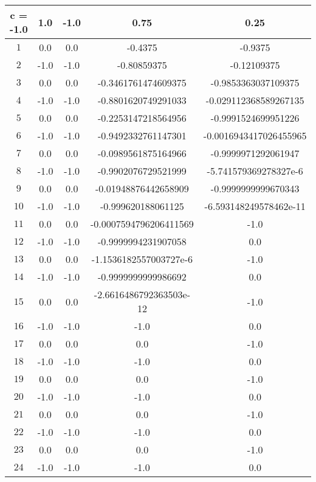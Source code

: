 \documentclass{article}
\begin{document}
\begin{table}[H]
\centering
\begin{tabular}{|c|c|c|c|c|}
\hline
c = -1.0 & 1.0 & -1.0 & 0.75 & 0.25  \\ \hline
\( 1 \) & 0.0 & 0.0 & -0.4375 & -0.9375  \\ \hline
\( 2 \) & -1.0 & -1.0 & -0.80859375 & -0.12109375  \\ \hline
\( 3 \) & 0.0 & 0.0 & -0.3461761474609375 & -0.9853363037109375 \\ \hline
\( 4 \) & -1.0 & -1.0 & -0.8801620749291033 & -0.029112368589267135  \\ \hline
\( 5 \) & 0.0 & 0.0 & -0.2253147218564956 & -0.9991524699951226  \\ \hline
\( 6 \) & -1.0 & -1.0 & -0.9492332761147301 & -0.0016943417026455965  \\ \hline
\( 7 \) & 0.0 & 0.0 & -0.0989561875164966 & -0.9999971292061947  \\ \hline
\( 8 \) & -1.0 & -1.0 & -0.9902076729521999 & -5.741579369278327e-6  \\ \hline
\( 9 \) & 0.0 & 0.0 & -0.01948876442658909 & -0.9999999999670343  \\ \hline
\( 10 \) & -1.0 & -1.0 & -0.999620188061125 & -6.593148249578462e-11  \\ \hline
\( 11 \) & 0.0 & 0.0 & -0.0007594796206411569 & -1.0 \\ \hline
\( 12 \) & -1.0 & -1.0 & -0.9999994231907058 & 0.0  \\ \hline
\( 13 \) & 0.0 & 0.0 & -1.1536182557003727e-6 & -1.0  \\ \hline
\( 14 \) & -1.0 & -1.0 & -0.9999999999986692 & 0.0 \\ \hline
\( 15 \) & 0.0 & 0.0 & -2.6616486792363503e-12 & -1.0  \\ \hline
\( 16 \) & -1.0 & -1.0 & -1.0 & 0.0  \\ \hline
\( 17 \) & 0.0 & 0.0 & 0.0 & -1.0  \\ \hline
\( 18 \) & -1.0 & -1.0 & -1.0 & 0.0  \\ \hline
\( 19 \) & 0.0 & 0.0 & 0.0 & -1.0 \\ \hline
\( 20 \) & -1.0 & -1.0 & -1.0 & 0.0  \\ \hline
\( 21 \) & 0.0 & 0.0 & 0.0 & -1.0  \\ \hline
\( 22 \) & -1.0 & -1.0 & -1.0 & 0.0  \\ \hline
\( 23 \) & 0.0 & 0.0 & 0.0 & -1.0  \\ \hline
\( 24 \) & -1.0 & -1.0 & -1.0 & 0.0  \\ \hline

\end{tabular}
\end{table}
\end{document}
